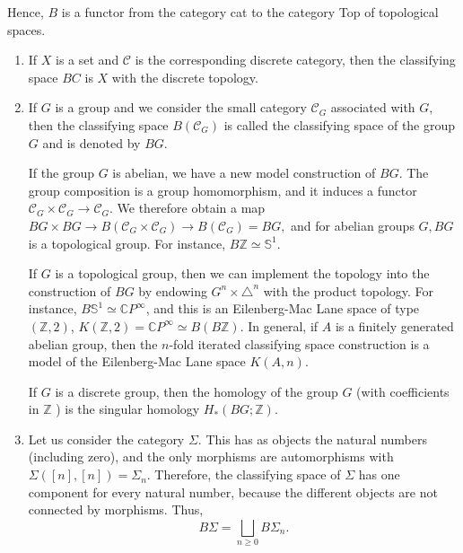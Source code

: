 Hence, $B$ is a functor from the category cat to the category Top of topological spaces.


\begin{example}
    \begin{enumerate}
        \item If $X$ is a set and $\mathcal{C}$ is the corresponding discrete category, then the classifying space $B C$ is $X$ with the discrete topology.
        \item If $G$ is a group and we consider the small category $\mathcal{C}_G$ associated with $G$, then the classifying space $B\left(\mathcal{C}_G\right)$ is called the classifying space of the group $G$ and is denoted by $B G$. 
        
        If the group $G$ is abelian, we have a new model construction of $BG$. The group composition is a group homomorphism, and it induces a functor $\mathcal{C}_G \times \mathcal{C}_G \rightarrow \mathcal{C}_G$. We therefore obtain a map
        $
        B G \times B G \rightarrow B\left(\mathcal{C}_G \times \mathcal{C}_G\right) \rightarrow B\left(\mathcal{C}_G\right)=B G,
        $
        and for abelian groups $G, B G$ is a topological group. For instance, $B \mathbb{Z} \simeq \mathbb{S}^1$.

        If $G$ is a topological group, then we can implement the topology into the construction of $B G$ by endowing $G^n \times \triangle^n$ with the product topology.
        For instance, $B \mathbb{S}^1 \simeq \mathbb{C} P^{\infty}$, and this is an Eilenberg-Mac Lane space of type $(\mathbb{Z}, 2)$, $K(\mathbb{Z}, 2)=\mathbb{C} P^{\infty} \simeq B(B \mathbb{Z})$. In general, if $A$ is a finitely generated abelian group, then the $n$-fold iterated classifying space construction is a model of the Eilenberg-Mac Lane space $K(A, n)$. 
        
        If $G$ is a discrete group, then the homology of the group $G$ (with coefficients in $\mathbb{Z}$ ) is the singular homology $H_*(B G ; \mathbb{Z})$.
        \item Let us consider the category $\Sigma$. This has as objects the natural numbers (including zero), and the only morphisms are automorphisms with $\Sigma([n],[n])=\Sigma_n$. Therefore, the classifying space of $\Sigma$ has one component for every natural number, because the different objects are not connected by morphisms. Thus,
        $$
        B \Sigma=\bigsqcup_{n \geq 0} B \Sigma_n .
        $$
        
    \end{enumerate}
\end{example}

